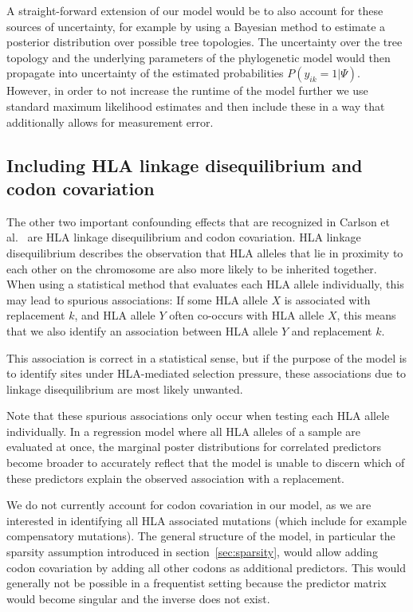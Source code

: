\documentclass[fleqn,11pt]{SelfArx} %
\begin{document}
A straight-forward extension of our model would be to also account for these sources of uncertainty, for example by using a Bayesian method to estimate a posterior distribution over possible tree topologies. The uncertainty over the tree topology and the underlying parameters of the phylogenetic model would then propagate into uncertainty of the estimated probabilities \(P(y_{ik}=1|\Psi)\). However, in order to not increase the runtime of the model further we  use standard maximum likelihood estimates and then include these in a way that additionally allows for measurement error.

\subsection*{Including HLA linkage disequilibrium and codon covariation}

The other two important confounding effects that are recognized in Carlson et al.~\cite{Carlson2008} are HLA linkage disequilibrium and codon covariation.
HLA linkage disequilibrium describes the observation that HLA alleles that lie in proximity to each other on the chromosome are also more likely to be inherited together. When using a statistical method that evaluates each HLA allele individually, this may lead to spurious associations: If some HLA allele \(X\) is associated with replacement \(k\), and HLA allele \(Y\) often co-occurs with HLA allele \(X\), this means that we also identify an association between HLA allele \(Y\) and replacement \(k\).

This association is correct in a statistical sense, but if the purpose of the model is to identify sites under HLA-mediated selection pressure, these associations due to linkage disequilibrium are most likely unwanted.

Note that these spurious associations only occur when testing each HLA allele individually. In a regression model where all HLA alleles of a sample are evaluated at once, the marginal poster distributions for correlated predictors become broader to accurately reflect that the model is unable to discern which of these predictors explain the observed association with a replacement.

We do not currently account for codon covariation in our model, as we are interested in identifying all HLA associated mutations (which include for example compensatory mutations). The general structure of the model, in particular the sparsity assumption introduced in section~\ref{sec:sparsity}, would allow adding codon covariation by adding all other codons as additional predictors. This would generally not be possible in a frequentist setting because the predictor matrix would become singular and the inverse does not exist. 
\end{document}

